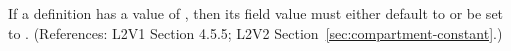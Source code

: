If a \Compartment definition has a  value of
, then its  field value must either default to or be
set to .  (References: L2V1 Section 4.5.5; L2V2
Section~\ref{sec:compartment-constant}.)
